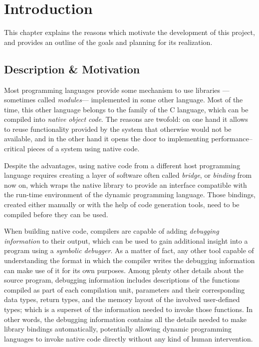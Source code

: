 
\cleardoublepage
\setchaptertoc
\chapter{Introduction}

This chapter explains the reasons which motivate the development of this
project, and provides an outline of the goals and planning for its
realization.

\afterintro

\section{Description \& Motivation}

Most programming languages provide some mechanism to use libraries —sometimes
called \emph{modules}— implemented in some other language. Most of the time,
this other language belongs to the family of the C language, which can be
compiled into \emph{native object code}. The reasons are twofold: on one hand
it allows to reuse functionality provided by the system that otherwise would
not be available, and in the other hand it opens the door to implementing
performance--critical pieces of a system using native code.

Despite the advantages, using native code from a different host programming
language requires creating a layer of software often called \emph{bridge}, or
\emph{binding} from now on, which wraps the native library to provide an
interface compatible with the run-time environment of the dynamic programming
language. Those bindings, created either manually or with the help of code
generation tools, need to be compiled before they can be used.

When building native code, compilers are capable of adding
\emph{debugging information} to their output, which can be used to gain
additional insight into a program using a \emph{symbolic debugger}. As
a matter of fact, any other tool capable of understanding the format in which
the compiler writes the debugging information can make use of it for its own
purposes. Among plenty other details about the source program, debugging
information includes descriptions of the functions compiled as part of each
compilation unit, parameters and their corresponding data types, return types,
and the memory layout of the involved user-defined types; which is a superset
of the information needed to invoke those functions. In other words, the
debugging information contains all the details needed to make library bindings
automatically, potentially allowing dynamic programming languages to invoke
native code directly without any kind of human intervention.

